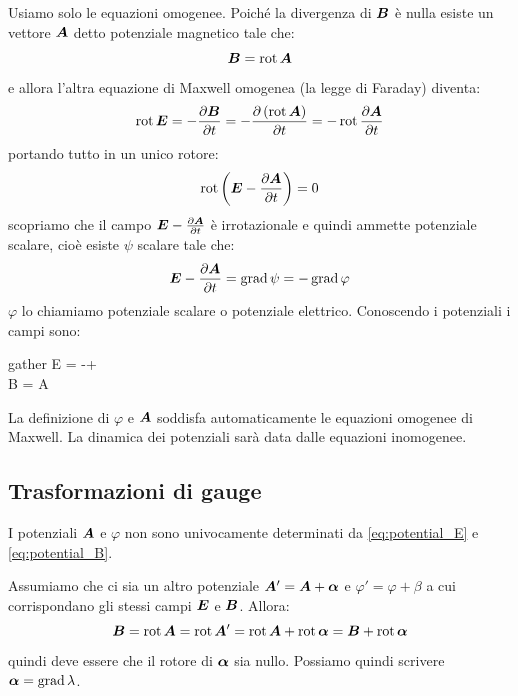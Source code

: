 Usiamo solo le equazioni omogenee. Poiché la divergenza di $\boldsymbol{B}$ è nulla esiste un vettore $\boldsymbol{A}$ detto potenziale magnetico tale che:
\begin{equation}
  \boldsymbol{B}=\operatorname{rot}\boldsymbol{A}
  \label{ppp02}
\end{equation}
e allora l'altra equazione di Maxwell omogenea (la legge di Faraday) diventa:
\begin{equation}
  \operatorname{rot}\boldsymbol{E}=-\frac{\partial\boldsymbol{B}}{\partial t}=-\frac{\partial\left(\operatorname{rot}\boldsymbol{A}\right)}{\partial t}=-\operatorname{rot}\frac{\partial\boldsymbol{A}}{\partial t}
\end{equation}
portando tutto in un unico rotore:
\begin{equation}
  \operatorname{rot}\left(\boldsymbol{E}-\frac{\partial \boldsymbol{A}}{\partial t}\right)=0
\end{equation}
scopriamo che il campo $\boldsymbol{E}-\frac{\partial \boldsymbol{A}}{\partial t}$ è irrotazionale e quindi ammette potenziale scalare, cioè esiste $\psi$ scalare tale che:
\begin{equation}
  \boldsymbol{E}-\frac{\partial \boldsymbol{A}}{\partial t}=\operatorname{grad}\psi=-\operatorname{grad}\varphi
  \label{ppp01}
\end{equation}
$\varphi$ lo chiamiamo potenziale scalare o potenziale elettrico. Conoscendo i potenziali i campi sono:
\begin{eqimp}{gather}
  \ve E = -\grad\varphi+\label{eq:potential_E}\\
  \ve B = \rot\ve A\label{eq:potential_B}
\end{eqimp}
La definizione di $\varphi$ e $\boldsymbol{A}$ soddisfa automaticamente le equazioni omogenee di Maxwell. La dinamica dei potenziali sarà data dalle equazioni inomogenee.

\subsection{Trasformazioni di gauge}
I potenziali $\boldsymbol{A}$ e $\varphi$ non sono univocamente determinati da \eqref{eq:potential_E} e \eqref{eq:potential_B}.

Assumiamo che ci sia un altro potenziale $\boldsymbol{A}'=\boldsymbol{A} + \boldsymbol{\alpha}$ e $\varphi'=\varphi+\beta$ a cui corrispondano gli stessi campi $\boldsymbol{E}$ e $\boldsymbol{B}$. Allora:
\begin{equation}
  \boldsymbol{B} = \operatorname{rot}\boldsymbol{A} = \operatorname{rot}\boldsymbol{A}' = \operatorname{rot}\boldsymbol{A} + \operatorname{rot}\boldsymbol{\alpha} = \boldsymbol{B} + \operatorname{rot}\boldsymbol{\alpha}
\end{equation}
quindi deve essere che il rotore di $\boldsymbol{\alpha}$ sia nullo. Possiamo quindi scrivere $\boldsymbol{\alpha}=\operatorname{grad}\lambda$.

